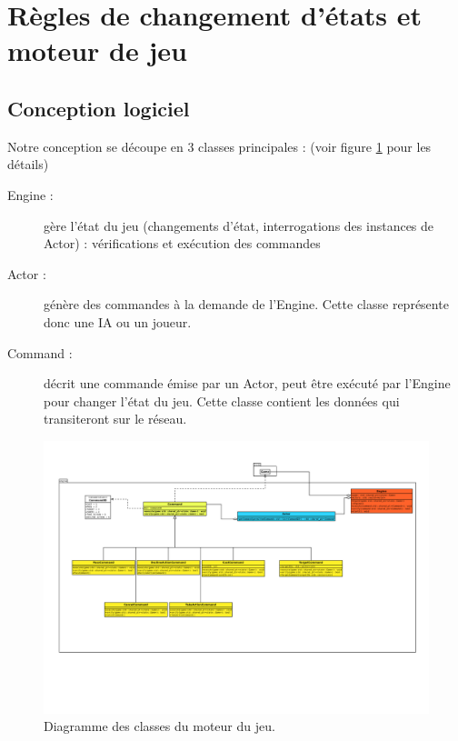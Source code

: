 \documentclass[a4paper,12pt]{article}
\begin{document}
\clearpage
\section{Règles de changement d'états et moteur de jeu}

\subsection{Conception logiciel}

Notre conception se découpe en 3 classes principales : (voir figure \ref{uml:engine} pour les détails)
\begin{description}
\item[Engine :] gère l'état du jeu (changements d'état, interrogations des instances de Actor) : vérifications et exécution des commandes
\item[Actor :] génère des commandes à la demande de l'Engine. Cette classe représente donc une IA ou un joueur.
\item[Command :] décrit une commande émise par un Actor, peut être exécuté par l'Engine pour changer l'état du jeu. Cette classe contient les données qui transiteront sur le réseau.\\
\end{description}

\begin{landscape}
\begin{figure}[p]
\includegraphics[width=0.8\paperheight, page=1, trim=0 400 100 150, clip]{engine.pdf}
\caption{\label{uml:engine}Diagramme des classes du moteur du jeu.} 
\end{figure}
\end{landscape}
\end{document}
